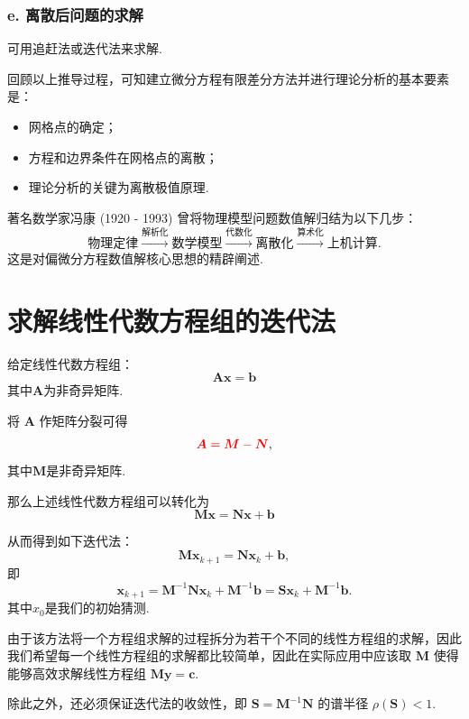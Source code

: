 \subsubsection*{e. 离散后问题的求解}
可用追赶法或迭代法来求解.\par
回顾以上推导过程，可知建立微分方程有限差分方法并进行理论分析的基本要素是：
\begin{itemize}
    \item 网格点的确定；
    \item 方程和边界条件在网格点的离散；
    \item 理论分析的关键为离散极值原理.
\end{itemize}

\begin{note}
    著名数学家冯康 (1920 - 1993) 曾将物理模型问题数值解归结为以下几步：
    \begin{equation*}
        \text{物理定律} \xrightarrow{\text{解析化}} \text{数学模型} \xrightarrow{\text{代数化}} \text{离散化} \xrightarrow{\text{算术化}} \text{上机计算}.
    \end{equation*}
    这是对偏微分方程数值解核心思想的精辟阐述.
\end{note}

\section{求解线性代数方程组的迭代法}

给定线性代数方程组：
\[\boldsymbol{A}\boldsymbol{x} = \boldsymbol{b}
\]
其中$\bm{A}$为非奇异矩阵.

将 $\boldsymbol{A}$ 作矩阵分裂可得
\[{\color{red} \boldsymbol{A} = \boldsymbol{M} - \boldsymbol{N}},\]
其中$\boldsymbol{M}$是非奇异矩阵.

那么上述线性代数方程组可以转化为
\[\boldsymbol{M}\boldsymbol{x} = \boldsymbol{N}\boldsymbol{x} + \boldsymbol{b}\]\par
从而得到如下迭代法：
\[\boldsymbol{M}\boldsymbol{x}_{k+1} = \boldsymbol{N}\boldsymbol{x}_k + \boldsymbol{b},\]
即
\begin{equation}\label{matrix_iteration}
    \boldsymbol{x}_{k+1} = \boldsymbol{M}^{-1}\boldsymbol{N}\boldsymbol{x}_k + \boldsymbol{M}^{-1}\boldsymbol{b} = \boldsymbol{S}\boldsymbol{x}_k + \boldsymbol{M}^{-1}\boldsymbol{b}.
\end{equation}
其中$x_0$是我们的初始猜测.\par
由于该方法将一个方程组求解的过程拆分为若干个不同的线性方程组的求解，因此我们希望每一个线性方程组的求解都比较简单，因此在实际应用中应该取 $\boldsymbol{M}$ 使得能够高效求解线性方程组 $\boldsymbol{M}\boldsymbol{y} = \boldsymbol{c}$.\par
除此之外，还必须保证迭代法的收敛性，即 $\boldsymbol{S} = \boldsymbol{M}^{-1}\boldsymbol{N}$ 的谱半径 $\rho(\boldsymbol{S}) < 1$.\par


